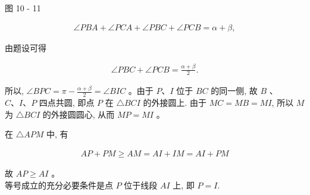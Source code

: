 \documentclass[10pt]{article}
\begin{document}
图 10 - 11

\begin{align*}
\angle P B A+\angle P C A+\angle P B C+\angle P C B=\alpha+\beta,
\end{align*}

由题设可得

\begin{align*}
\angle P B C+\angle P C B=\frac{\alpha+\beta}{2} .
\end{align*}

所以, $\angle B P C=\pi-\frac{\alpha+\beta}{2}=\angle B I C$ 。由于 $P 、 I$ 位于 $B C$ 的同一侧, 故 $B$ 、 $C 、 I 、 P$ 四点共圆, 即点 $P$ 在 $\triangle B C I$ 的外接圆上. 由于 $M C=M B=M I$, 所以 $M$ 为 $\triangle B C I$ 的外接圆圆心, 从而 $M P=M I$ 。

在 $\triangle A P M$ 中, 有

\begin{align*}
A P+P M \geqslant A M=A I+I M=A I+P M
\end{align*}

故 $A P \geqslant A I$ 。\\
等号成立的充分必要条件是点 $P$ 位于线段 $A I$ 上, 即 $P=I$.
\end{document}
